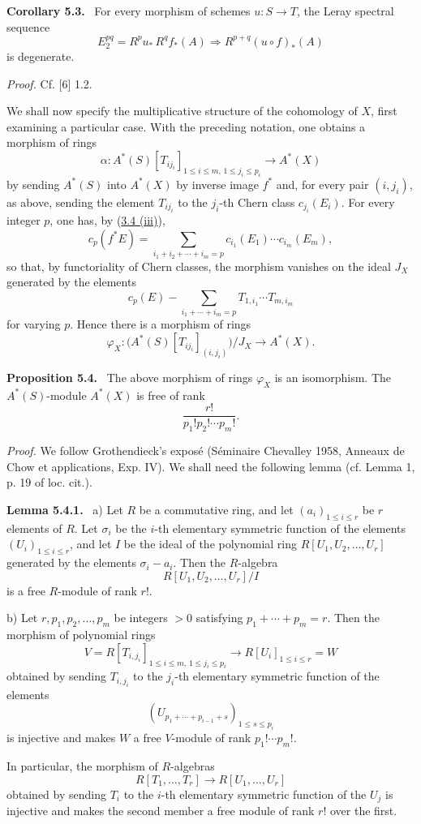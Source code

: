 \documentclass[11pt]{article}
\newenvironment{statement}[1]{\par\medskip\noindent\textbf{#1.}\ }{\par\medskip}
\begin{document}
\label{sga5:VII:corollary:5.3}\begin{statement}{Corollary 5.3}
For every morphism of schemes $u:S\to T$, the Leray spectral sequence
\[
E_2^{pq}=R^p u_*\,R^q f_*(A)\Rightarrow R^{p+q}(u\circ f)_*(A)
\]
is degenerate.
\end{statement}

\emph{Proof.} Cf. [6] 1.2.

We shall now specify the multiplicative structure of the cohomology of $X$, first examining a particular case. With the preceding notation, one obtains a morphism of rings
\[
\alpha:A^*(S)[T_{ij_i}]_{1\le i\le m,\,1\le j_i\le p_i}\to A^*(X)
\]
by sending $A^*(S)$ into $A^*(X)$ by inverse image $f^*$ and, for every pair $(i,j_i)$, as above, sending the element $T_{ij_i}$ to the $j_i$-th Chern class $c_{j_i}(E_i)$. For every integer $p$, one has, by (\hyperref[sga5:VII:proposition:3.4]{3.4 (iii)}),
\[
c_p(f^*E)=\sum_{i_1+i_2+\cdots+i_m=p}c_{i_1}(E_1)\cdots c_{i_m}(E_m),
\]
so that, by functoriality of Chern classes, the morphism vanishes on the ideal $J_X$ generated by the elements
\[
c_p(E)-\sum_{i_1+\cdots+i_m=p}T_{1,i_1}\cdots T_{m,i_m}
\]
for varying $p$. Hence there is a morphism of rings
\[
\varphi_X:\bigl(A^*(S)[T_{ij_i}]_{(i,j_i)}\bigr)/J_X\to A^*(X).
\]

\label{sga5:VII:proposition:5.4}\begin{statement}{Proposition 5.4}
The above morphism of rings $\varphi_X$ is an isomorphism. The $A^*(S)$-module $A^*(X)$ is free of rank
\[
\frac{r!}{p_1!p_2!\cdots p_m!}.
\]
\end{statement}

\emph{Proof.} We follow Grothendieck's exposé (Séminaire Chevalley 1958, Anneaux de Chow et applications, Exp. IV). We shall need the following lemma (cf. Lemma 1, p. 19 of loc. cit.).

\label{sga5:VII:lemma:5.4.1}\begin{statement}{Lemma 5.4.1}
a) Let $R$ be a commutative ring, and let $(a_i)_{1\le i\le r}$ be $r$ elements of $R$. Let $\sigma_i$ be the $i$-th elementary symmetric function of the elements $(U_i)_{1\le i\le r}$, and let $I$ be the ideal of the polynomial ring $R[U_1,U_2,\ldots,U_r]$ generated by the elements $\sigma_i-a_i$. Then the $R$-algebra
\[
R[U_1,U_2,\ldots,U_r]/I
\]
is a free $R$-module of rank $r!$.

b) Let $r,p_1,p_2,\ldots,p_m$ be integers $>0$ satisfying $p_1+\cdots+p_m=r$. Then the morphism of polynomial rings
\[
V=R[T_{i,j_i}]_{1\le i\le m,\,1\le j_i\le p_i}
\longrightarrow R[U_i]_{1\le i\le r}=W
\]
obtained by sending $T_{i,j_i}$ to the $j_i$-th elementary symmetric function of the elements
\[
(U_{p_1+\cdots+p_{i-1}+s})_{1\le s\le p_i}
\]
is injective and makes $W$ a free $V$-module of rank $p_1!\cdots p_m!$.

In particular, the morphism of $R$-algebras
\[
R[T_1,\ldots,T_r]\to R[U_1,\ldots,U_r]
\]
obtained by sending $T_i$ to the $i$-th elementary symmetric function of the $U_j$ is injective and makes the second member a free module of rank $r!$ over the first.
\end{statement}
\end{document}
